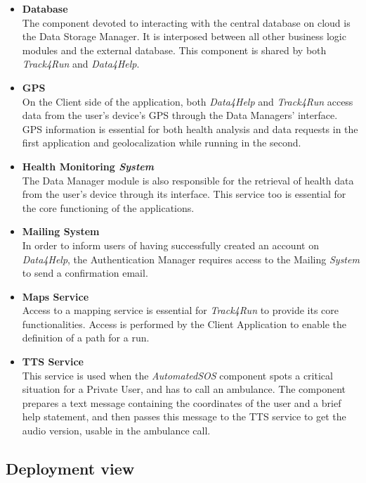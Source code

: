 \documentclass[titlepage]{article}
\begin{document}
\begin{itemize}
        \item {\bf Database }\\
        The component devoted to interacting with the central database on cloud is the Data Storage Manager. It is interposed between all other business logic modules and the external database. This component is shared by both {\it Track4Run} and {\it Data4Help}.
		\item {\bf GPS }\\
		On the Client side of the application, both {\it Data4Help} and {\it Track4Run} access data from the user’s device’s GPS through the Data Managers’ interface. GPS information is essential for both health analysis and data requests in the first application and geolocalization while running in the second.
		\item {\bf Health Monitoring {\it System} }\\
		The Data Manager module is also responsible for the retrieval of health data from the user’s device through its interface. This service too is essential for the core functioning of the applications.
		\item {\bf Mailing System }\\
		In order to inform users of having successfully created an account on {\it Data4Help}, the Authentication Manager requires access to the Mailing {\it System} to send a confirmation email.
		\item {\bf Maps Service }\\
		Access to a mapping service is essential for {\it Track4Run} to provide its core functionalities. Access is performed by the Client Application to enable the definition of a path for a run.
		\item {\bf TTS Service }\\
		This service is used when the {\it AutomatedSOS} component spots a critical situation for a Private User, and has to call an ambulance. The component prepares a text message containing the coordinates of the user and a brief help statement, and then passes this message to the TTS service to get the audio version, usable in the ambulance call.
    \end{itemize} 

\pagebreak

\subsection{Deployment view}
\end{document}
